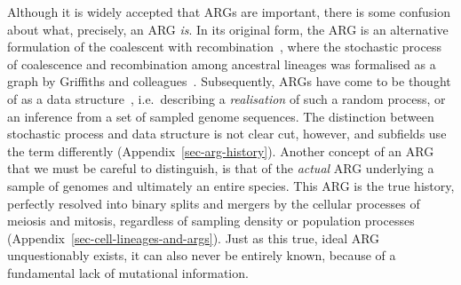 \documentclass{article}
\begin{document}
Although it is widely accepted that ARGs are important, there is some
confusion about what, precisely, an ARG \emph{is}.
In its original form, the ARG is an alternative
formulation of the coalescent with recombination~\citep{hudson1983properties},
where the stochastic process of coalescence and recombination
among ancestral lineages was formalised as a
graph by Griffiths and colleagues~\citep{griffiths1991two,
ethier1990two,griffiths1996ancestral,griffiths1997ancestral}.
Subsequently, ARGs have come to be thought of as a data
structure~\citep{minichiello2006mapping}, i.e.\ describing
a \emph{realisation} of such a random process,
or an inference from a set of sampled genome sequences.
The distinction between stochastic process
and data structure is not clear cut, however,
and subfields use the term
differently (Appendix~\ref{sec-arg-history}).
Another concept of an ARG that we must be careful to distinguish,
is that of the \emph{actual} ARG underlying a sample of genomes
and ultimately an entire species. This ARG is the true history,
perfectly resolved into binary splits and mergers by
the cellular processes of meiosis and mitosis, regardless
of sampling density or population processes
(Appendix~\ref{sec-cell-lineages-and-args}).
Just as this true, ideal ARG unquestionably exists,
it can also never be entirely known,
because of a fundamental lack of mutational information.
\end{document}
